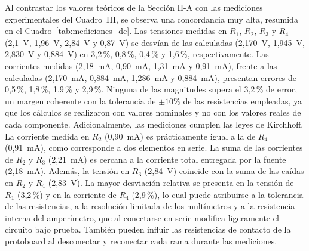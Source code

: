 \documentclass[journal, a4paper]{IEEEtran}
\begin{document}
Al contrastar los valores teóricos de la Sección II-A con las mediciones experimentales del Cuadro~III, se observa una concordancia muy alta, resumida en el Cuadro~\ref{tab:mediciones_dc}. Las tensiones medidas en $R_1$, $R_2$, $R_3$ y $R_4$ (2,1~V, 1,96~V, 2,84~V y 0,87~V) se desvían de las calculadas (2,170~V, 1,945~V, 2,830~V y 0,884~V) en 3,2\,\%, 0,8\,\%, 0,4\,\% y 1,6\,\%, respectivamente. Las corrientes medidas (2,18~mA, 0,90~mA, 1,31~mA y 0,91~mA), frente a las calculadas (2,170~mA, 0,884~mA, 1,286~mA y 0,884~mA), presentan errores de 0,5\,\%, 1,8\,\%, 1,9\,\% y 2,9\,\%. Ninguna de las magnitudes supera el 3,2\,\% de error, un margen coherente con la tolerancia de $\pm 10\%$ de las resistencias empleadas, ya que los cálculos se realizaron con valores nominales y no con los valores reales de cada componente. Adicionalmente, las mediciones cumplen las leyes de Kirchhoff. La corriente medida en $R_2$ (0,90~mA) es prácticamente igual a la de $R_4$ (0,91~mA), como corresponde a dos elementos en serie. La suma de las corrientes de $R_2$ y $R_3$ (2,21~mA) es cercana a la corriente total entregada por la fuente (2,18~mA). Además, la tensión en $R_3$ (2,84~V) coincide con la suma de las caídas en $R_2$ y $R_4$ (2,83~V). La mayor desviación relativa se presenta en la tensión de $R_1$ (3,2\,\%) y en la corriente de $R_4$ (2,9\,\%), lo cual puede atribuirse a la tolerancia de las resistencias, a la resolución limitada de los multímetros y a la resistencia interna del amperímetro, que al conectarse en serie modifica ligeramente el circuito bajo prueba. También pueden influir las resistencias de contacto de la protoboard al desconectar y reconectar cada rama durante las mediciones.
\end{document}
